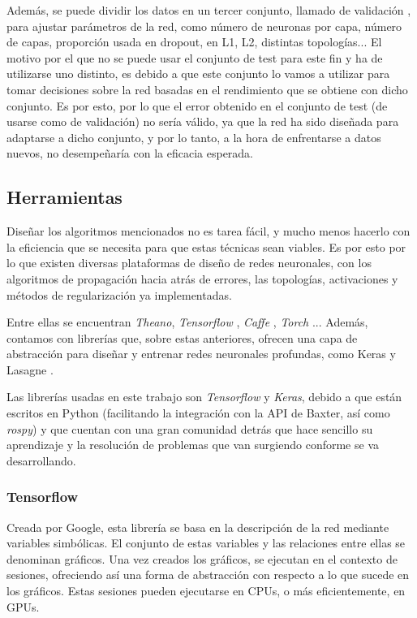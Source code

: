 Además, se puede dividir los datos en un tercer conjunto, llamado de validación \cite{kohavi1995study}, para ajustar parámetros de la red, como número de neuronas por capa, número de capas, proporción usada en dropout, en L1, L2, distintas topologías... El motivo por el que no se puede usar el conjunto de test para este fin y ha de utilizarse uno distinto, es debido a que este conjunto lo vamos a utilizar para tomar decisiones sobre la red basadas en el rendimiento que se obtiene con dicho conjunto. Es por esto, por lo que el error obtenido en el conjunto de test (de usarse como de validación) no sería válido, ya que la red ha sido diseñada para adaptarse a dicho conjunto, y por lo tanto, a la hora de enfrentarse a datos nuevos, no desempeñaría con la eficacia esperada.

\subsection{Herramientas}
Diseñar los algoritmos mencionados no es tarea fácil, y mucho menos hacerlo con la eficiencia que se necesita para que estas técnicas sean viables. Es por esto por lo que existen diversas plataformas de diseño de redes neuronales, con los algoritmos de propagación hacia atrás de errores, las topologías, activaciones y métodos de regularización ya implementadas.

Entre ellas se encuentran \textit{Theano}, \textit{Tensorflow} \cite{tensorflow}, \textit{Caffe} \cite{caffe}, \textit{Torch} \cite{torch}... Además, contamos con librerías que, sobre estas anteriores, ofrecen una capa de abstracción para diseñar y entrenar redes neuronales profundas, como Keras \cite{keras} y Lasagne \cite{lasagne}.

Las librerías usadas en este trabajo son \textit{Tensorflow} y \textit{Keras}, debido a que están escritos en Python (facilitando la integración con la API de Baxter, así como \textit{rospy}) y que cuentan con una gran comunidad detrás que hace sencillo su aprendizaje y la resolución de problemas que van surgiendo conforme se va desarrollando.
\subsubsection{Tensorflow}
Creada por Google, esta librería se basa en la descripción de la red mediante variables simbólicas. El conjunto de estas variables y las relaciones entre ellas se denominan gráficos. Una vez creados los gráficos, se ejecutan en el contexto de sesiones, ofreciendo así una forma de abstracción con respecto a lo que sucede en los gráficos. Estas sesiones pueden ejecutarse en CPUs, o más eficientemente, en GPUs.

